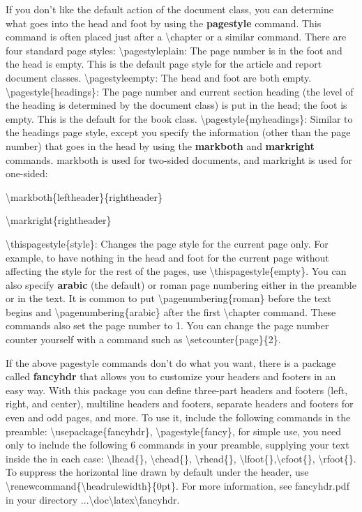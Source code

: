 \documentclass[12pt,openright]{book}
\begin{document}
If you don’t like the default action of the document class, you can determine what goes into the head and foot by using the \textbf{pagestyle} command. This command is often placed just after a \textbackslash chapter or a similar command. There are four standard page styles: \textbackslash pagestyle{plain}: The page number is in the foot and the head is empty. This is the default page style for the article and report document classes.  \textbackslash pagestyle{empty}: The head and foot are both empty. \textbackslash pagestyle\{headings\}: The page number and current section heading (the level of the heading is determined by the document class) is put in the head; the foot is empty. This is the default for the book class. \textbackslash pagestyle\{myheadings\}: Similar to the headings page style, except you specify the information (other than the page number) that goes in the head by using the \textbf{markboth} and \textbf{markright} commands. markboth is used for two-sided documents, and markright is used for one-sided:

\textbackslash markboth\{leftheader\}\{rightheader\}

\textbackslash markright\{rightheader\}

\textbackslash thispagestyle\{style\}: Changes the page style for the current page only. For example, to have nothing in the head and foot for the current page without affecting the style for the rest of the pages, use \textbackslash thispagestyle\{empty\}. You can also specify \textbf{arabic} (the default) or roman page numbering either in the preamble or in the text. It is common to put \textbackslash pagenumbering\{roman\} before the text begins and \textbackslash pagenumbering\{arabic\} after the first \textbackslash chapter command. These commands also set the page number to 1. You can change the page number counter yourself with a command such as \textbackslash setcounter\{page\}\{2\}.

If the above pagestyle commands don’t do what you want, there is a package called \textbf{fancyhdr} that allows you to customize your headers and footers in an easy way. With this package you can define three-part headers and footers (left, right, and center), multiline headers and footers, separate headers and footers for even and odd pages, and more. To use it, include the following commands in the preamble: \textbackslash usepackage\{fancyhdr\}, \textbackslash pagestyle\{fancy\}, for simple use, you need only to include the following 6 commands in your preamble, supplying your text inside the {} in each case: \textbackslash lhead\{\}, \textbackslash chead\{\}, \textbackslash rhead\{\}, \textbackslash lfoot\{\},\textbackslash cfoot\{\}, \textbackslash rfoot\{\}. To suppress the horizontal line drawn by default under the header, use \textbackslash renewcommand\{\textbackslash headrulewidth\}\{0pt\}. For more information, see fancyhdr.pdf in your directory ...\textbackslash doc\textbackslash latex\textbackslash fancyhdr.
\end{document}
